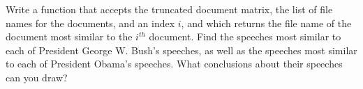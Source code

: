 \begin{problem}
Write a function that accepts the truncated document matrix, the list of file names 
for the documents, and an index $i$, and which returns the file name of the document 
most similar to the $i^{th}$ document. Find the speeches most similar to each of 
President George W. Bush's speeches, as well as the speeches most similar to 
each of President Obama's speeches. What conclusions about their speeches can you draw?
\end{problem}

